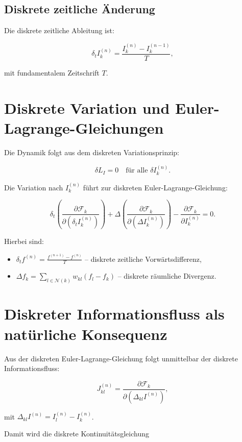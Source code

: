\subsection{Diskrete zeitliche Änderung}
\label{sub:diskrete_zeit_aenderung}

Die diskrete zeitliche Ableitung ist:

\[
\delta_t I_k^{(n)} = \frac{I_k^{(n)} - I_k^{(n-1)}}{T},
\]

mit fundamentalem Zeitschrift \( T \).

\section{Diskrete Variation und Euler-Lagrange-Gleichungen}
\label{sec:euler_lagrange_diskret}

Die Dynamik folgt aus dem diskreten Variationsprinzip:

\[
\delta L_I = 0 \quad \text{für alle } \delta I_k^{(n)}.
\]

Die Variation nach \( I_k^{(n)} \) führt zur diskreten Euler-Lagrange-Gleichung:

\[
\delta_t \left( \frac{\partial \mathcal{F}_k}{\partial (\delta_t I_k^{(n)})} \right) + \Delta \left( \frac{\partial \mathcal{F}_k}{\partial (\Delta I_k^{(n)})} \right) - \frac{\partial \mathcal{F}_k}{\partial I_k^{(n)}} = 0.
\]

Hierbei sind:

\begin{itemize}
    \item \( \delta_t f^{(n)} = \frac{f^{(n+1)} - f^{(n)}}{T} \) – diskrete zeitliche Vorwärtsdifferenz,
    \item \( \Delta f_k = \sum_{l \in \mathcal{N}(k)} w_{kl} (f_l - f_k) \) – diskrete räumliche Divergenz.
\end{itemize}

\section{Diskreter Informationsfluss als natürliche Konsequenz}
\label{sec:informationsfluss_konsequenz}

Aus der diskreten Euler-Lagrange-Gleichung folgt unmittelbar der diskrete Informationsfluss:

\[
J_{kl}^{(n)} = \frac{\partial \mathcal{F}_k}{\partial (\Delta_{kl} I^{(n)})},
\]

mit \( \Delta_{kl} I^{(n)} = I_l^{(n)} - I_k^{(n)} \).

Damit wird die diskrete Kontinuitätsgleichung

